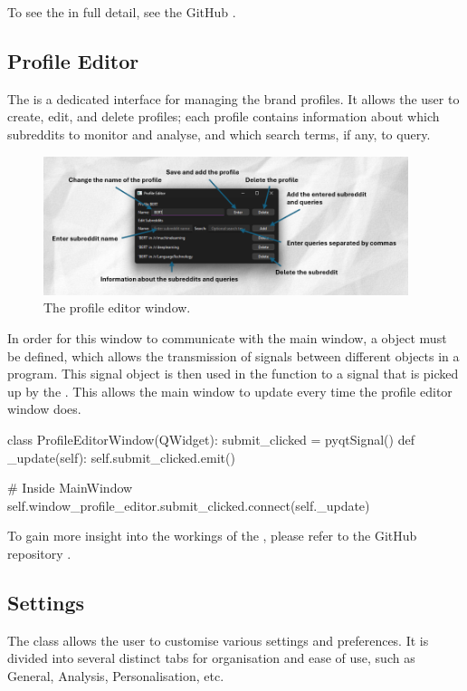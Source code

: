     To see the  in full detail, see the GitHub \citep{sentimentanalysistool}.

    \subsection{Profile Editor}
    The  is a dedicated interface for managing the brand profiles. It allows the user to create, edit, and delete profiles; each profile contains information about which subreddits to monitor and analyse, and which search terms, if any, to query.

    \begin{figure}[h]
        \centering
            \includegraphics[width=0.95\textwidth]{figures/profile-editor-window-labels.png}
        \caption{The profile editor window.}
    \end{figure}

    In order for this window to communicate with the main window, a  object must be defined, which allows the transmission of signals between different objects in a program. This signal object is then used in the  function to  a signal that is picked up by the . This allows the main window to update every time the profile editor window does.

    \begin{python}
class ProfileEditorWindow(QWidget):
    submit_clicked = pyqtSignal()
    def _update(self):
        self.submit_clicked.emit()

# Inside MainWindow
self.window_profile_editor.submit_clicked.connect(self._update)
    \end{python}

    To gain more insight into the workings of the , please refer to the GitHub repository \citep{sentimentanalysistool}.

    \subsection{Settings}
    The  class allows the user to customise various settings and preferences. It is divided into several distinct tabs for organisation and ease of use, such as General, Analysis, Personalisation, etc.

